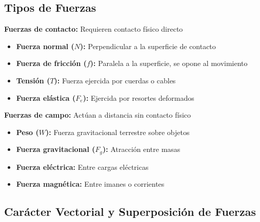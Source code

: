 \subsection{Tipos de Fuerzas}

\begin{seccion}

\begin{definicion}
    \textbf{Fuerzas de contacto:} Requieren contacto físico directo
\end{definicion}

\begin{itemize}
    \item \textbf{Fuerza normal ($N$):} Perpendicular a la superficie de contacto
    \item \textbf{Fuerza de fricción ($f$):} Paralela a la superficie, se opone al movimiento
    \item \textbf{Tensión ($T$):} Fuerza ejercida por cuerdas o cables
    \item \textbf{Fuerza elástica ($F_e$):} Ejercida por resortes deformados
\end{itemize}

\begin{definicion}
    \textbf{Fuerzas de campo:} Actúan a distancia sin contacto físico
\end{definicion}

\begin{itemize}
    \item \textbf{Peso ($W$):} Fuerza gravitacional terrestre sobre objetos
    \item \textbf{Fuerza gravitacional ($F_g$):} Atracción entre masas
    \item \textbf{Fuerza eléctrica:} Entre cargas eléctricas
    \item \textbf{Fuerza magnética:} Entre imanes o corrientes
\end{itemize}
\end{seccion}

\subsection{Carácter Vectorial y Superposición de Fuerzas}

